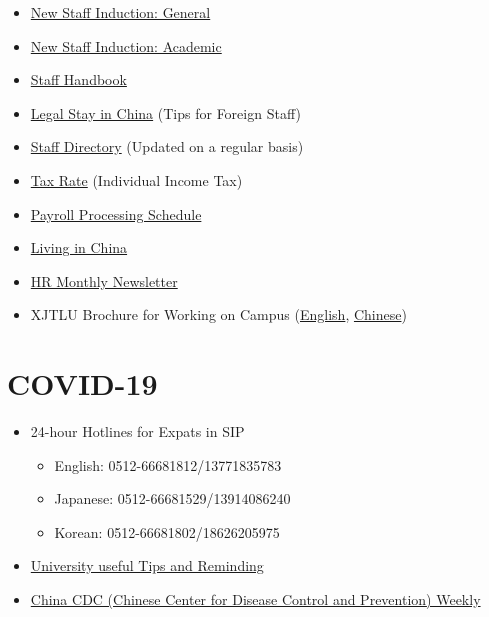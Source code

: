 \documentclass[
]{book}
\providecommand{\tightlist}{%
  \setlength{\itemsep}{0pt}\setlength{\parskip}{0pt}}
\begin{document}
\begin{itemize}
\tightlist
\item
  \href{https://box.xjtlu.edu.cn/\#common/lib/633bf817-899c-4be7-ab42-1d4986349f4c/New\%20Staff\%20Induction}{New Staff Induction: General}
\item
  \href{https://box.xjtlu.edu.cn/\#common/lib/76a264ad-c956-4ed2-abd7-7088081fe1fd/}{New Staff Induction: Academic}
\item
  \href{https://box.xjtlu.edu.cn/smart-link/1d9f1e2d-39e6-46de-b46f-e459502ed6df/}{Staff Handbook}
\item
  \href{https://box.xjtlu.edu.cn/smart-link/88e4699f-4ee6-43aa-a83d-0c86c1589818/}{Legal Stay in China} (Tips for Foreign Staff)
\item
  \href{https://box.xjtlu.edu.cn/smart-link/f7764aa3-7a36-40a7-bf2d-47f8bc57b1e7/}{Staff Directory} (Updated on a regular basis)
\item
  \href{https://box.xjtlu.edu.cn/smart-link/1999109a-e714-4ada-ade1-4785e256b15d/}{Tax Rate} (Individual Income Tax)
\item
  \href{https://box.xjtlu.edu.cn/smart-link/27acb50a-1e80-46df-843a-a944d36764d5/}{Payroll Processing Schedule}
\item
  \href{https://www.expat.com/en/destination/asia/china/}{Living in China}
\item
  \href{https://connect.xjtlu.edu.cn/user/td-hr/hr-monthly-newsletter-december-2019}{HR Monthly Newsletter}
\item
  XJTLU Brochure for Working on Campus (\href{https://box.xjtlu.edu.cn/smart-link/50c776fc-eec7-4219-a03b-eca4ad1d577f/}{English}, \href{https://box.xjtlu.edu.cn/smart-link/e678f16a-a01e-44ba-87f2-4cddf3bc2c23/}{Chinese})
\end{itemize}

\hypertarget{covid-19}{%
\section{COVID-19}\label{covid-19}}

\begin{itemize}
\tightlist
\item
  24-hour Hotlines for Expats in SIP

  \begin{itemize}
  \tightlist
  \item
    English: 0512-66681812/13771835783
  \item
    Japanese: 0512-66681529/13914086240\\
  \item
    Korean: 0512-66681802/18626205975
  \end{itemize}
\item
  \href{https://www.xjtlu.edu.cn/en/novel-coronavirus-pneumonia/useful-tips-and-reminding/}{University useful Tips and Reminding}
\item
  \href{http://weekly.chinacdc.cn/index.htm}{China CDC (Chinese Center for Disease Control and Prevention}\href{http://weekly.chinacdc.cn/index.htm}{) Weekly}
\end{itemize}
\end{document}
